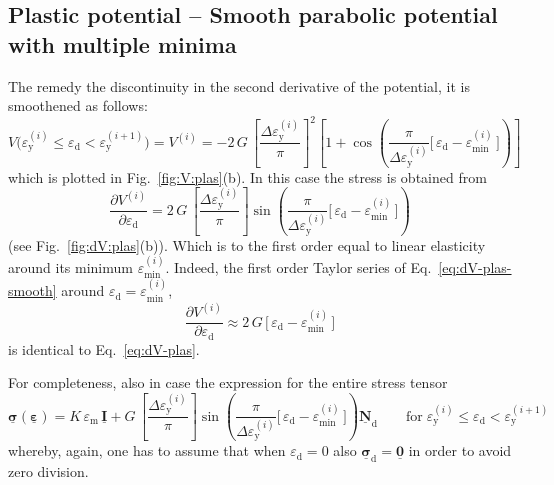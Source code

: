 \documentclass[times,namecite]{goose-article}
\newcommand\T[1]{\underline{\bm{{#1}}}}
\begin{document}
\subsection{Plastic potential -- Smooth parabolic potential with multiple minima}

The remedy the discontinuity in the second derivative of the potential, it is smoothened as follows:
\begin{equation}\label{eq:V-plas-smooth}
  V \big(
    \varepsilon_\mathrm{y}^{(i)} \leq \varepsilon_\mathrm{d} < \varepsilon_\mathrm{y}^{(i+1)}
  \big)
  =
  V^{(i)}
  =
  - 2 \, G \,
  \left[ \frac{\Delta \varepsilon_\mathrm{y}^{(i)}}{\pi} \right]^2
  \left[
    1
    +
    \cos \left(
      \frac{ \pi }{ \Delta \varepsilon_\mathrm{y}^{(i)} }
      \Big[\, \varepsilon_\mathrm{d} - \varepsilon_\mathrm{min}^{(i)} \,\Big]
    \right)
  \right]
\end{equation}
which is plotted in Fig.~\ref{fig:V:plas}(b). In this case the stress is obtained from
\begin{equation}\label{eq:dV-plas-smooth}
  \frac{\partial V^{(i)}}{\partial \varepsilon_\mathrm{d}}
  =
  2 \, G \,
  \left[ \frac{\Delta \varepsilon_\mathrm{y}^{(i)}}{\pi} \right]
  \sin \left(
    \frac{ \pi }{ \Delta \varepsilon_\mathrm{y}^{(i)} }
    \Big[\, \varepsilon_\mathrm{d} - \varepsilon_\mathrm{min}^{(i)} \,\Big]
  \right)
\end{equation}
(see Fig.~\ref{fig:dV:plas}(b)). Which is to the first order equal to linear elasticity around its minimum $\varepsilon_\mathrm{min}^{(i)}$. Indeed, the first order Taylor series of Eq.~\eqref{eq:dV-plas-smooth} around $\varepsilon_\mathrm{d} = \varepsilon_\mathrm{min}^{(i)}$,
\begin{equation}
  \frac{\partial V^{(i)}}{\partial \varepsilon_\mathrm{d}}
  \approx
  2 \, G \, \Big[\, \varepsilon_\mathrm{d} - \varepsilon_\mathrm{min}^{(i)} \,\Big]
\end{equation}
is identical to Eq.~\eqref{eq:dV-plas}.

For completeness, also in case the expression for the entire stress tensor
\begin{equation}
  \T{\sigma} ( \T{\varepsilon} )
  =
  K \, \varepsilon_\mathrm{m} \, \T{I}
  +
  G \,
  \left[ \frac{\Delta \varepsilon_\mathrm{y}^{(i)}}{\pi} \right]
  \sin \left(
    \frac{ \pi }{ \Delta \varepsilon_\mathrm{y}^{(i)} }
    \Big[\, \varepsilon_\mathrm{d} - \varepsilon_\mathrm{min}^{(i)} \,\Big]
  \right)
  \T{N}_\mathrm{d}
  \qquad
  \mathrm{for}
  \;
  \varepsilon_\mathrm{y}^{(i)} \leq \varepsilon_\mathrm{d} < \varepsilon_\mathrm{y}^{(i+1)}
\end{equation}
whereby, again, one has to assume that when $\varepsilon_\mathrm{d} = 0$ also $\T{\sigma}_\mathrm{d} = \T{0}$ in order to avoid zero division.
\end{document}
